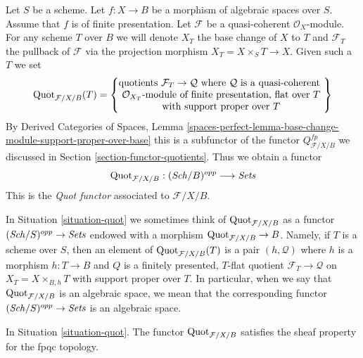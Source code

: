 \begin{situation}
\label{situation-quot}
Let $S$ be a scheme. Let $f : X \to B$ be a morphism of
algebraic spaces over $S$. Assume that $f$ is of finite presentation.
Let $\mathcal{F}$ be a quasi-coherent $\mathcal{O}_X$-module.
For any scheme $T$ over $B$ we will denote $X_T$ the base change of
$X$ to $T$ and $\mathcal{F}_T$ the pullback
of $\mathcal{F}$ via the projection morphism $X_T = X \times_S T \to X$.
Given such a $T$ we set
$$
\mathrm{Quot}_{\mathcal{F}/X/B}(T) =
\left\{
\begin{matrix}
\text{quotients }\mathcal{F}_T \to \mathcal{Q}\text{ where }
\mathcal{Q}\text{ is a quasi-coherent }\\
\mathcal{O}_{X_T}\text{-module of finite presentation, flat over }T\\
\text{with support proper over }T
\end{matrix}
\right\}
$$
By Derived Categories of Spaces, Lemma
\ref{spaces-perfect-lemma-base-change-module-support-proper-over-base}
this is a subfunctor of the functor $Q^{fp}_{\mathcal{F}/X/B}$
we discussed in Section \ref{section-functor-quotients}.
Thus we obtain a functor
\begin{equation}
\label{equation-quot}
\mathrm{Quot}_{\mathcal{F}/X/B} : (\mathit{Sch}/B)^{opp} \longrightarrow \textit{Sets}
\end{equation}
This is the {\it Quot functor} associated to $\mathcal{F}/X/B$.
\end{situation}

\noindent
In Situation \ref{situation-quot} we sometimes think of
$\mathrm{Quot}_{\mathcal{F}/X/B}$ as a functor
$(\mathit{Sch}/S)^{opp} \to \textit{Sets}$ endowed
with a morphism $\mathrm{Quot}_{\mathcal{F}/X/B} \to B$.
Namely, if $T$ is a scheme over $S$, then an element
of $\mathrm{Quot}_{\mathcal{F}/X/B}(T)$ is a pair $(h, \mathcal{Q})$
where $h$ is a morphism $h : T \to B$
and $Q$ is a finitely presented, $T$-flat quotient
$\mathcal{F}_T \to \mathcal{Q}$ on $X_T = X \times_{B, h} T$
with support proper over $T$. In particular, when we say
that $\mathrm{Quot}_{\mathcal{F}/X/B}$ is an algebraic space, we mean that the
corresponding functor $(\mathit{Sch}/S)^{opp} \to \textit{Sets}$ is an algebraic space.

\begin{lemma}
\label{lemma-quot-sheaf}
In Situation \ref{situation-quot}. The functor $\mathrm{Quot}_{\mathcal{F}/X/B}$
satisfies the sheaf property for the fpqc topology.
\end{lemma}

